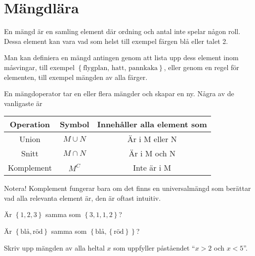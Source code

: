 \section{Mängdlära}

\begin{definition}[Mängd]
En mängd är en samling element där ordning och antal inte spelar någon roll. Dessa element kan vara vad som helst till exempel färgen blå eller talet 2.
\end{definition}

Man kan definiera en mängd antingen genom att lista upp dess element inom måsvingar, till exempel \(\left\{\text{flygplan, hatt, pannkaka} \right\}\), eller genom en regel för elementen, till exempel mängden av alla färger.

\begin{definition}[Mängdoperationer]
	En mängdoperator tar en eller flera mängder och skapar en ny. Några av de vanligaste är
	\begin{center}
		\begin{tabular}{|ccc|}
			\hline
			Operation & Symbol & Innehåller alla element som\\ \hline
			Union & \(M\cup N\) & Är i M eller N \\ \hline
			Snitt & \(M \cap  N\) & Är i M och N \\ \hline
			Komplement & \(M^C\) & Inte är i M \\ \hline
		\end{tabular}
	\end{center}
	Notera! Komplement fungerar bara om det finns en universalmängd som berättar vad alla relevanta element är, den är oftast intuitiv.
\end{definition}

\begin{problem}
	Är \(\left\{1, 2, 3\right\}\) samma som \(\left\{3, 1, 1, 2\right\}\)?
\end{problem}

\begin{problem}
	Är \(\left\{\text{blå} , \text{röd} \right\}\) samma som \(\left\{\text{blå}, \left\{\text{röd} \right\}\right\}\)?
\end{problem}

\begin{problem}
	Skriv upp mängden av alla heltal \(x\) som uppfyller påståendet ``\(x>2\) och \(x <5\)''.
\end{problem}


